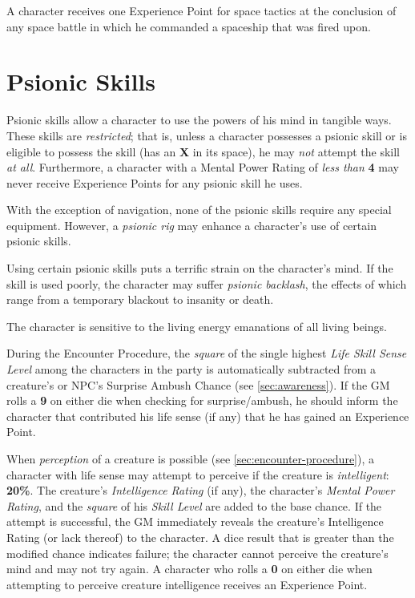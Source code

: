 A character receives one Experience Point for space tactics at the
conclusion of any space battle in which he commanded a spaceship that
was fired upon.

\section{Psionic Skills}
\label{sec:psionicskills}

Psionic skills allow a character to use the powers of his mind in
tangible ways.  These skills are \emph{restricted}; that is, unless a
character possesses a psionic skill or is eligible to possess the
skill (has an \textbf{\textsf{X}} in its space), he may \emph{not}
attempt the skill \emph{at all}.  Furthermore, a character with a
Mental Power Rating of \emph{less than} \textbf{4} may never receive
Experience Points for any psionic skill he uses.

With the exception of navigation, none of the psionic skills require
any special equipment.  However, a \emph{psionic rig} may enhance a
character's use of certain psionic skills.

Using certain psionic skills puts a terrific strain on the character's
mind.  If the skill is used poorly, the character may suffer
\emph{psionic backlash}, the effects of which range from a temporary
blackout to insanity or death.

\label{sec:skill-life-sense}

The character is sensitive to the living energy emanations of all
living beings.

During the Encounter Procedure, the \emph{square} of the single
highest \emph{Life Skill Sense Level} among the characters in the
party is automatically subtracted from a creature's or NPC's Surprise
Ambush Chance (see \ref{sec:awareness}).  If the GM rolls a \textbf{9}
on either die when checking for surprise/ambush, he should inform the
character that contributed his life sense (if any) that he has gained
an Experience Point.

\begin{tasklist}
\item When \emph{perception} of a creature is possible (see
  \ref{sec:encounter-procedure}), a character with life sense may
  attempt to perceive if the creature is \emph{intelligent}:
  \textbf{20\%}.  The creature's \emph{Intelligence Rating} (if any),
  the character's \emph{Mental Power Rating}, and the \emph{square} of
  his \emph{Skill Level} are added to the base chance.  If the attempt
  is successful, the GM immediately reveals the creature's
  Intelligence Rating (or lack thereof) to the character.  A dice
  result that is greater than the modified chance indicates failure;
  the character cannot perceive the creature's mind and may not try
  again.  A character who rolls a \textbf{0} on either die when
  attempting to perceive creature intelligence receives an Experience
  Point.
\end{tasklist}


